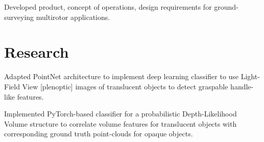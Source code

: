 \documentclass[letterpaper]{deedy-resume} %
\begin{document}
\begin{minipage}[t]{0.73\textwidth}
\sectionspace %



\begin{tightitemize}
\item Developed product, concept of operations, design requirements for ground-surveying multirotor applications.
\end{tightitemize}
\vspace{-5pt}



\section{Research}


\begin{tightitemize}
\item Adapted PointNet architecture to implement deep learning classifier to use Light-Field View [plenoptic] images of translucent objects to detect graspable handle-like features.
\item Implemented PyTorch-based classifier for a probabilistic Depth-Likelihood Volume structure to correlate volume features for translucent objects with corresponding ground truth point-clouds for opaque objects.
\end{tightitemize}
\sectionspace %


\end{minipage}
\end{document}
